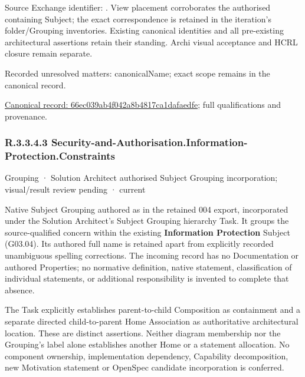 Source Exchange identifier: \texttt{}. View placement corroborates
the authorised containing Subject; the exact correspondence is retained in the
iteration's folder/Grouping inventories. Existing canonical identities and all
pre-existing architectural assertions retain their standing. Archi visual
acceptance and HCRL closure remain separate.


{\small Recorded unresolved matters: canonicalName; exact scope remains in the canonical record.}\par
{\footnotesize \href{../../../../continuum/grouping/66ec039ab4f042a8b4817ca1dafaedfe.md}{Canonical record: 66ec039ab4f042a8b4817ca1dafaedfe}; full qualifications and provenance.}\par
\subsubsection*{R.3.3.4.3 Security-and-Authorisation.Information-Protection.Constraints}
\label{navigation:R.3.3.4.3}

\label{element:a49c1e5afd224d12bae33fac366a1d37}
{\small Grouping · Solution Architect authorised Subject Grouping incorporation; visual/result review pending · current}\par

Native Subject Grouping authored as \texttt{} in the retained 004 export,
incorporated under the Solution Architect's Subject Grouping hierarchy Task.
It groups the source-qualified \texttt{} concern within
the existing \textbf{Information Protection} Subject (G03.04). Its authored full name
is retained apart from explicitly recorded unambiguous spelling corrections.
The incoming record has no Documentation or authored Properties; no normative
definition, native statement, classification of individual statements, or
additional responsibility is invented to complete that absence.



The Task explicitly establishes parent-to-child Composition as containment and
a separate directed child-to-parent Home Association as authoritative architectural
location. These are distinct assertions. Neither diagram membership nor the
Grouping's label alone establishes another Home or a statement allocation.
No component ownership, implementation dependency, Capability decomposition,
new Motivation statement or OpenSpec candidate incorporation is conferred.



